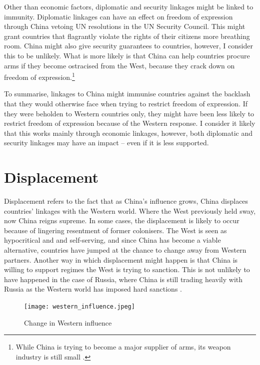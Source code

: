 Other than economic factors, diplomatic and security linkages might be linked to immunity. Diplomatic linkages can have an effect on freedom of expression through China vetoing UN resolutions in the UN Security Council. This might grant countries that flagrantly violate the rights of their citizens more breathing room. China might also give security guarantees to countries, however, I consider this to be unlikely. What is more likely is that China can help countries procure arms if they become ostracised from the West, because they crack down on freedom of expression\citep{george_trends_2025, gunter_chinas_2024}.\footnote{While China is trying to become a major supplier of arms, its weapon industry is still small \citep{gunter_chinas_2024}.}

To summarise, linkages to China might immunise countries against the backlash that they would otherwise face when trying to restrict freedom of expression. If they were beholden to Western countries only, they might have been less likely to restrict freedom of expression because of the Western response. I consider it likely that this works mainly through economic linkages, however, both diplomatic and security linkages may have an impact -- even if it is less supported.

\section{Displacement}
Displacement refers to the fact that as China's influence grows, China displaces countries' linkages with the Western world. Where the West previously held sway, now China reigns supreme. In some cases, the displacement is likely to occur because of lingering resentment of former colonisers. The West is seen as hypocritical and and self-serving, and since China has become a viable alternative, countries have jumped at the chance to change away from Western partners. Another way in which displacement might happen is that China is willing to support regimes the West is trying to sanction. This is not unlikely to have happened in the case of Russia, where China is still trading heavily with Russia as the Western world has imposed hard sanctions \citep{beijing_newsroom_china-russia_2025}.

\begin{figure}[hbt!]
\centering
\texttt{[image: western\_influence.jpeg]}
\caption{Change in Western influence}
\label{fig:west}
\end{figure}

